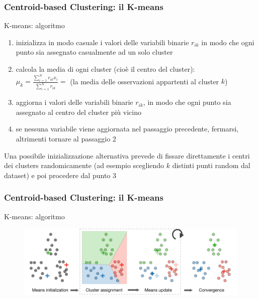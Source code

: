 \begin{frame}

	\frametitle{{\color{GradientDescentDiagramBlue}Centroid-based Clustering}: il K-means}

	\begin{block}{K-means: algoritmo}
		\begin{enumerate}
			\item inizializza in modo casuale i valori delle variabili binarie $r_{ik}$ in modo che ogni punto sia assegnato casualmente ad un solo cluster 
			\item calcola la media di ogni cluster (cioè il centro del cluster):\\
				$\mu_k = \frac{\sum_{i=1}^{N}r_{ik}x_i}{\sum_{i=1}^{N}r_{ik}} =$ (la media delle osservazioni appartenti al cluster $k$)
			\item aggiorna i valori delle variabili binarie $r_{ik}$, in modo che ogni punto sia assegnato al centro del cluster più vicino
			\item se nessuna variabile viene aggiornata nel passaggio precedente, fermarsi, altrimenti tornare al passaggio 2
		\end{enumerate}
		\vspace{2mm}
		Una possibile inizializzazione alternativa prevede di fissare direttamente i centri dei clusters randomicamente (ad esempio scegliendo $k$ distinti punti random dal dataset) e poi procedere dal punto 3
	\end{block}

\end{frame}


\begin{frame}

	\frametitle{{\color{GradientDescentDiagramBlue}Centroid-based Clustering}: il K-means}

	\begin{block}{K-means: algoritmo}
		\begin{figure}[!htbp]
			\centering
			\includegraphics[width=1.0\linewidth]{images/unsupervised/kmeans/kmeans_algorithm.png}
		\end{figure}
	\end{block}

\end{frame}


